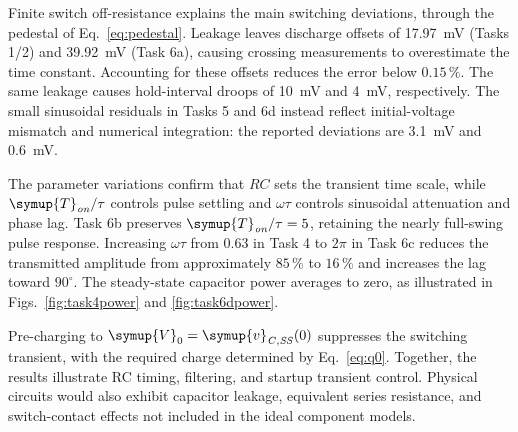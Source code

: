 \documentclass[12pt,a4paper]{article}
\begin{document}
	Finite switch off-resistance explains the main switching deviations,
	through the pedestal of Eq.~\eqref{eq:pedestal}.  Leakage leaves
	discharge offsets of \SI{17.97}{\milli\volt}
	(Tasks 1/2) and \SI{39.92}{\milli\volt} (Task 6a), causing crossing
	measurements to overestimate the time constant.  Accounting for
	these offsets reduces the error below $0.15\,\%$.  The same leakage
	causes hold-interval droops of \SI{10}{\milli\volt} and
	\SI{4}{\milli\volt}, respectively.  The small sinusoidal residuals
	in Tasks 5 and 6d instead reflect initial-voltage mismatch and
	numerical integration: the reported deviations are
	\SI{3.1}{\milli\volt} and \SI{0.6}{\milli\volt}.
	
	The parameter variations confirm that $RC$ sets the transient time
	scale, while $\symup{T}_{\mathit{on}}/\tau$ controls pulse settling and $\omega\tau$
	controls sinusoidal attenuation and phase lag.  Task 6b preserves
	$\symup{T}_{\mathit{on}}/\tau=5$, retaining the nearly full-swing pulse response.
	Increasing $\omega\tau$ from $0.63$ in Task 4 to $2\pi$ in Task 6c
	reduces the transmitted amplitude from approximately $85\,\%$ to
	$16\,\%$ and increases the lag toward $90^\circ$.
	The steady-state capacitor power averages to zero, as illustrated
	in Figs.~\ref{fig:task4power} and \ref{fig:task6dpower}.
	
	Pre-charging to $\symup{V}_{0}=\symup{v}_{\mathit{C,SS}}(0)$ suppresses the switching
	transient, with the required charge determined by Eq.~\eqref{eq:q0}.
	Together, the results illustrate RC timing, filtering, and startup
	transient control.  Physical circuits would also exhibit capacitor
	leakage, equivalent series resistance, and switch-contact effects
	not included in the ideal component models.
	
\end{document}
